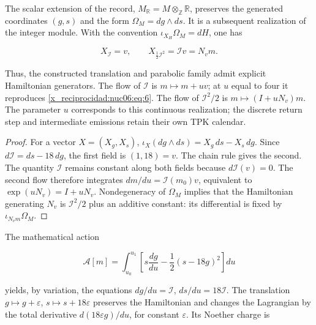 \begin{theorem}
\label{x_reciprocidad:nuc06:variacional}

The scalar extension of the record, \(M_{\mathbb R}=M\otimes_{\mathbb Z}\mathbb R\), preserves the generated coordinates \((g,s)\) and the form \(\Omega_M=dg\wedge ds\). It is a subsequent realization of the integer module. With the convention \(\iota_{X_H}\Omega_M=dH\), one has

\begin{equation}
X_{\mathcal I}=v,\qquad
X_{\frac12\mathcal I^2}=\mathcal I v=N_vm.
\label{x_reciprocidad:nuc06:eq:12a}
\end{equation}

Thus, the constructed translation and parabolic family admit explicit Hamiltonian generators. The flow of \(\mathcal I\) is \(m\mapsto m+uv\); at \(u\) equal to four it reproduces \eqref{x_reciprocidad:nuc06:eq:6}. The flow of \(\mathcal I^2/2\) is \(m\mapsto(I+uN_v)m\). The parameter \(u\) corresponds to this continuous realization; the discrete return step and intermediate emissions retain their own TPK calendar.
\end{theorem}

\begin{proof}
For a vector \(X=(X_g,X_s)\), \(\iota_X(dg\wedge ds)=X_g\,ds-X_s\,dg\). Since \(d\mathcal I=ds-18\,dg\), the first field is \((1,18)=v\). The chain rule gives the second. The quantity \(\mathcal I\) remains constant along both fields because \(d\mathcal I(v)=0\). The second flow therefore integrates \(dm/du=\mathcal I(m_0)v\), equivalent to \(\exp(uN_v)=I+uN_v\). Nondegeneracy of \(\Omega_M\) implies that the Hamiltonian generating \(N_v\) is \(\mathcal I^2/2\) plus an additive constant: its differential is fixed by \(\iota_{N_vm}\Omega_M\).
\end{proof}

The mathematical action

\begin{equation}
\mathscr A[m]=\int_{u_0}^{u_1}
\left[s\frac{dg}{du}-\frac12(s-18g)^2\right]du
\label{x_reciprocidad:nuc06:eq:12b}
\end{equation}

yields, by variation, the equations \(dg/du=\mathcal I\), \(ds/du=18\mathcal I\). The translation \(g\mapsto g+\varepsilon\), \(s\mapsto s+18\varepsilon\) preserves the Hamiltonian and changes the Lagrangian by the total derivative \(d(18\varepsilon g)/du\), for constant \(\varepsilon\). Its Noether charge is


